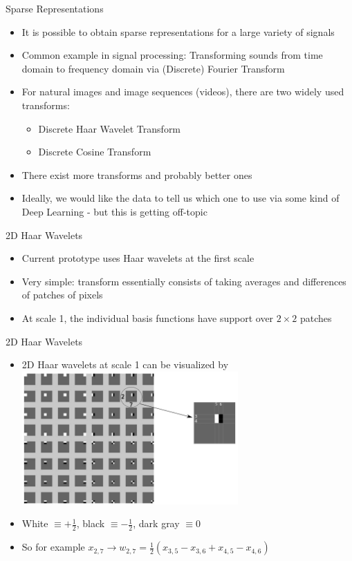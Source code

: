 \documentclass[xcolor=table]{beamer}
\numberwithin{equation}{section}
\begin{document}
\begin{frame}{Sparse Representations}
\begin{itemize}%
\item It is possible to obtain sparse representations for a large variety of signals
\item Common example in signal processing: Transforming sounds from time domain to frequency domain via (Discrete) Fourier Transform 
\item For natural images and image sequences (videos), there are two widely used transforms:
\begin{itemize}
\item Discrete Haar Wavelet Transform
\item Discrete Cosine Transform
\end{itemize}
\item There exist more transforms and probably better ones
\item Ideally, we would like the data to tell us which one to use via some kind of Deep Learning - but this is getting off-topic
\end{itemize}
\end{frame}

\begin{frame}{2D Haar Wavelets}
\begin{itemize}%
\item Current prototype uses Haar wavelets at the first scale
\item Very simple: transform essentially consists of taking averages and differences of patches of pixels
\item At scale 1, the individual basis functions have support over $2\times2$ patches
\end{itemize}
\end{frame}

\begin{frame}{2D Haar Wavelets}
\begin{itemize}%
\item 2D Haar wavelets at scale 1 can be visualized by \includegraphics[height=2in]{drawing2.png}
\item White $\equiv +\frac{1}{2}$, black $\equiv-\frac{1}{2}$, dark gray $\equiv0$ 
\item So for example $x_{2,7} \to w_{2,7} = \frac{1}{2}(x_{3,5} - x_{3,6} +  x_{4,5} - x_{4,6})$
\end{itemize}
\end{frame}
\end{document}
